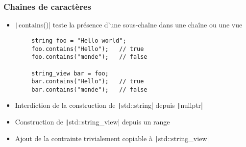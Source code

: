 \documentclass[C++.tex]{subfiles}
\begin{document}
\begin{frame}[fragile]
	\frametitle{Chaînes de caractères}
	\begin{itemize}
		\item \texttt|contains()| teste la présence d'une sous-chaîne dans une chaîne ou une vue
	\end{itemize}

	\begin{verbatim}
		string foo = "Hello world";
		foo.contains("Hello");   // true
		foo.contains("monde");   // false

		string_view bar = foo;
		bar.contains("Hello");   // true
		bar.contains("monde");   // false
	\end{verbatim}

	\begin{itemize}
		\item Interdiction de la construction de \texttt|std::string| depuis \texttt|nullptr|


		\item Construction de \texttt|std::string_view| depuis un range
		\item Ajout de la contrainte trivialement copiable à \texttt|std::string_view|
	\end{itemize}


\end{frame}
\end{document}
